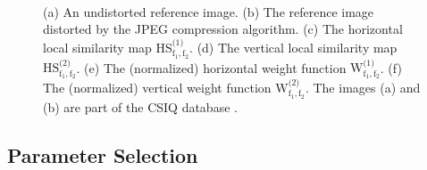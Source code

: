 \documentclass[11pt,a4paper]{article}
\begin{document}
\begin{figure}[!htb]
  \centering
  \begin{minipage}{0.28\textwidth}
	\\
  \end{minipage}\hfil  
  \begin{minipage}{0.28\textwidth}  
  \\
\end{minipage}\hfil  
\begin{minipage}{0.28\textwidth}
\\
\end{minipage}  
  \caption{(a) An undistorted reference image. (b) The reference image distorted by the JPEG compression algorithm. (c) The horizontal local similarity map $\operatorname{HS^\text{(1)}_{f_1,f_2}}$. (d) The vertical local similarity map $\operatorname{HS^\text{(2)}_{f_1,f_2}}$. (e) The (normalized) horizontal weight function $\operatorname{W^\text{(1)}_{f_1,f_2}}$. (f) The (normalized) vertical weight function $\operatorname{W^\text{(2)}_{f_1,f_2}}$. The images (a) and (b) are part of the CSIQ database \cite{LaCh2010}.}
  \label{fig:haarmaps}
\end{figure}

\subsection{Parameter Selection}
\end{document}
